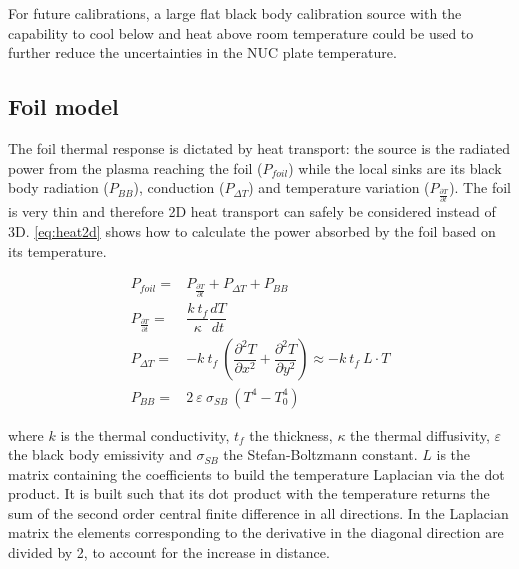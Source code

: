 For future calibrations, a large flat black body calibration source with the capability to cool below and heat above room temperature could be used to further reduce the uncertainties in the NUC plate temperature. 

\subsection{Foil model}\label{Foil model}
The foil thermal response is dictated by heat transport: the source is the radiated power from the plasma reaching the foil ($P_{foil}$) while the local sinks are its black body radiation ($P_{BB}$), conduction ($P_{\Delta T}$) and temperature variation ($P_{\frac {\partial T} {\partial t}}$). The foil is very thin and therefore 2D heat transport can safely be considered instead of 3D. \autoref{eq:heat2d} shows how to calculate the power absorbed by the foil based on its temperature.

\begin{equation}
\label{eq:heat2d}
\begin{aligned}
P_{foil}=& P_{\frac {\partial T} {\partial t}}+P_{\Delta T}+P_{BB}\\
P_{\frac {\partial T} {\partial t}}=& \dfrac{k \: t_f}{\kappa} \dfrac{dT}{dt} \\
 P_{\Delta T} =& -k \: t_f \:  \left( \dfrac{\partial^2 T}{\partial x^2} + \dfrac{\partial^2 T}{\partial y^2} \right) \approx -k \: t_f \: L \cdot T \\ P_{BB} =& 2 \: \varepsilon \: \sigma_{SB} \: (T^4 - T_0^4)
\end{aligned}
\end{equation}

where $k$ is the thermal conductivity, $t_f$ the thickness, $\kappa$ the thermal diffusivity, $\varepsilon$ the black body emissivity and $\sigma_{SB}$ the Stefan-Boltzmann constant. $L$ is the matrix containing the coefficients to build the temperature Laplacian via the dot product. It is built such that its dot product with the temperature returns the sum of the second order central finite difference in all directions. In the Laplacian matrix the elements corresponding to the derivative in the diagonal direction are divided by 2, to account for the increase in distance.

